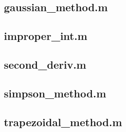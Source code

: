 \documentclass[a4paper,10pt,notitlepage,pdftex,headsepline]{scrartcl}
\begin{document}
\subsection*{gaussian\_method.m}
\subsection*{improper\_int.m}
\subsection*{second\_deriv.m}
\subsection*{simpson\_method.m}
\subsection*{trapezoidal\_method.m}
\end{document}
